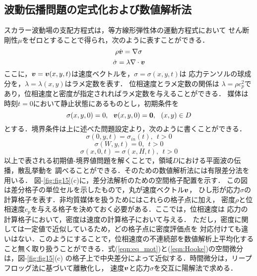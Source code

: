 \subsection{波動伝播問題の定式化および数値解析法}
スカラー波動場の支配方程式は，等方線形弾性体の運動方程式において
せん断剛性$\mu$をゼロとすることで得られ，次のように表すことができる．
\begin{equation}
	\rho \dot{\fat{v}}=\nabla \sigma
	\label{eqn:eq_mot}
\end{equation}
\begin{equation}
	\dot{\sigma}=\lambda \nabla \cdot \fat{v}
	\label{eqn:Hooke}
\end{equation}
ここに，$\mbox{\boldmath{$v$}}=\mbox{\boldmath{$v$}}(x,y,t)$は速度ベクトルを，$\sigma=\sigma(x,y,t)$は
応力テンソルの球成分を，$\lambda=\lambda(x,y)$はラメ定数を表す．
位相速度とラメ定数の関係は
$\lambda =\rho c_p^2$であり，位相速度と密度が指定されればラメ定数を与えることができる．
媒体は時刻$t=0$において静止状態にあるものとし，初期条件を
\begin{equation}
	\sigma(x,y,0)=0, \ \ \fat{v}(x,y,0)=\fat{0}, \ \ (x,y) \in D
	\label{eqn:IC}
\end{equation}
とする．境界条件は上に述べた問題設定より，次のように書くことができる．
\begin{equation}
	\sigma(0,y,t)=\sigma_{in}(t), \ \ t>0
	\label{eqn:}
\end{equation}
\begin{equation}
	\sigma(W,y,t)=0, \ \ t>0
	\label{eqn:}
\end{equation}
\begin{equation}
	\sigma(x,0,t)=\sigma(x,H,t),  \ \ t>0
	\label{eqn:}
\end{equation}
以上で表される初期値-境界値問題を解くことで，領域$D$における平面波の伝播，散乱挙動を
調べることができる．そのための数値解析法には有限差分法を用いる．
図-\ref{fig:fig15}(c)に，差分法解析のための空間格子配置を示す．
この図は差分格子の単位セルを示したもので，丸が速度ベクトル$\mbox{\boldmath{$v$}}$，
ひし形が応力$\sigma$の計算格子を表す．非均質媒体を扱うためにはこれらの格子点に加え，
密度$\rho$と位相速度$c_p$を与える格子を決めておく必要がある．ここでは，位相速度は
応力の計算格子において，密度は速度の計算格子において与える．
ただし，密度に関しては一定値で近似しているため，どの格子点に密度評価点を
対応付けても違いはない．このようにすることで，位相速度の不連続部を数値解析上平均化する
こと無く取り扱うことができる．式(\ref{eqn:eq_mot})と(\ref{eqn:Hooke})の空間微分は，図-\ref{fig:fig15}(c)
の格子上で中央差分によって近似する．時間微分は，リープフロッグ法に基づいて離散化し，
速度$\mbox{\boldmath{$v$}}$と応力$\sigma$を交互に陽解法で求める．
